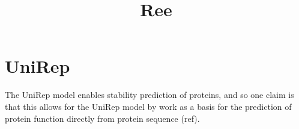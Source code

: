 \documentclass[a4paper,11pt]{article}
\title{Ree}
\date{}
\begin{document}
\maketitle
\vspace{-1.5cm}

\section*{UniRep}
The UniRep model enables stability prediction of proteins, and so one claim is that this allows for the UniRep model by work as a basis for the prediction of protein function directly from protein sequence (ref). 

\clearpage
\printbibliography[title={References}]
\end{document}
